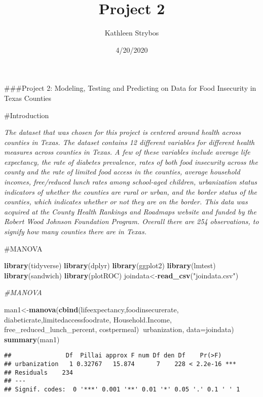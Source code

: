 \documentclass[]{article}
\title{Project 2}
\author{Kathleen Strybos}
\date{4/20/2020}
\newenvironment{Shaded}{\begin{snugshade}}{\end{snugshade}}
\newcommand{\CommentTok}[1]{\textcolor[rgb]{0.56,0.35,0.01}{\textit{#1}}}
\newcommand{\DataTypeTok}[1]{\textcolor[rgb]{0.13,0.29,0.53}{#1}}
\newcommand{\KeywordTok}[1]{\textcolor[rgb]{0.13,0.29,0.53}{\textbf{#1}}}
\newcommand{\NormalTok}[1]{#1}
\newcommand{\OperatorTok}[1]{\textcolor[rgb]{0.81,0.36,0.00}{\textbf{#1}}}
\newcommand{\StringTok}[1]{\textcolor[rgb]{0.31,0.60,0.02}{#1}}
\begin{document}
\maketitle

\#\#\#Project 2: Modeling, Testing and Predicting on Data for Food
Insecurity in Texas Counties

\#Introduction

\emph{The dataset that was chosen for this project is centered around
health across counties in Texas. The dataset contains 12 different
variables for different health measures across counties in Texas. A few
of these variables include average life expectancy, the rate of diabetes
prevalence, rates of both food insecurity across the county and the rate
of limited food access in the counties, average household incomes,
free/reduced lunch rates among school-aged children, urbanization status
indicators of whether the counties are rural or urban, and the border
status of the counties, which indicates whether or not they are on the
border. This data was acquired at the County Health Rankings and
Roadmaps website and funded by the Robert Wood Johnson Foundation
Program. Overall there are 254 observations, to signify how many
counties there are in Texas.}

\#MANOVA

\begin{Shaded}
\begin{Highlighting}[]
\KeywordTok{library}\NormalTok{(tidyverse)}
\KeywordTok{library}\NormalTok{(dplyr)}
\KeywordTok{library}\NormalTok{(ggplot2)}
\KeywordTok{library}\NormalTok{(lmtest)}
\KeywordTok{library}\NormalTok{(sandwich)}
\KeywordTok{library}\NormalTok{(plotROC)}
\NormalTok{joindata<-}\KeywordTok{read_csv}\NormalTok{(}\StringTok{"joindata.csv"}\NormalTok{)}

\CommentTok{#MANOVA}

\NormalTok{man1<-}\KeywordTok{manova}\NormalTok{(}\KeywordTok{cbind}\NormalTok{(lifeexpectancy,foodinsecurerate, diabeticrate,limitedaccessfoodrate, }
\NormalTok{  Household.Income, free_reduced_lunch_percent,}
\NormalTok{  costpermeal)}\OperatorTok{~}\NormalTok{urbanization, }\DataTypeTok{data=}\NormalTok{joindata)}
\KeywordTok{summary}\NormalTok{(man1)}
\end{Highlighting}
\end{Shaded}

\begin{verbatim}
##               Df  Pillai approx F num Df den Df    Pr(>F)    
## urbanization   1 0.32767   15.874      7    228 < 2.2e-16 ***
## Residuals    234                                             
## ---
## Signif. codes:  0 '***' 0.001 '**' 0.01 '*' 0.05 '.' 0.1 ' ' 1
\end{verbatim}
\end{document}
